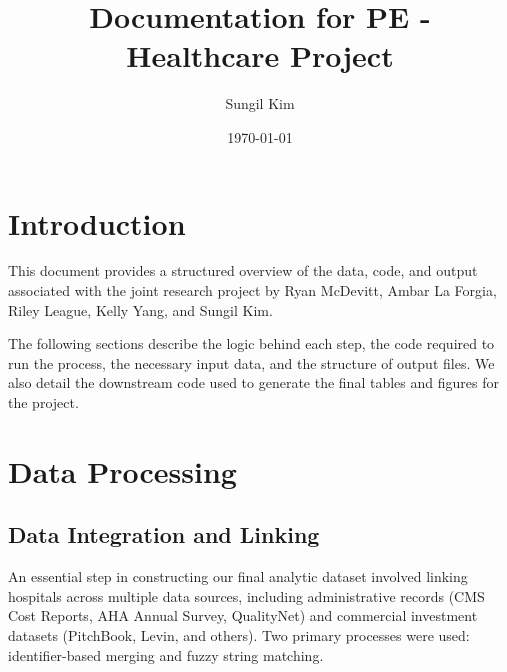 \documentclass[11pt]{article}
\begin{document}
\title{Documentation for PE - Healthcare Project}
\author{Sungil Kim} 
\date{\today}
\maketitle

\section{Introduction}

This document provides a structured overview of the data, code, and output associated with the joint research project by Ryan McDevitt, Ambar La Forgia, Riley League, Kelly Yang, and Sungil Kim.

The following sections describe the logic behind each step, the code required to run the process, the necessary input data, and the structure of output files. We also detail the downstream code used to generate the final tables and figures for the project.

\section{Data Processing}

\subsection{Data Integration and Linking}

An essential step in constructing our final analytic dataset involved linking hospitals across multiple data sources, including administrative records (CMS Cost Reports, AHA Annual Survey, QualityNet) and commercial investment datasets (PitchBook, Levin, and others). Two primary processes were used: identifier-based merging and fuzzy string matching.
\end{document}
